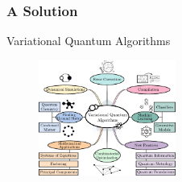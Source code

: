\begin{frame}
    \frametitle{A Solution}

    \begin{center}
        \textcolor{Periwinkle}{\large Variational Quantum Algorithms }

        \begin{figure}
            \includegraphics[width=0.4\textwidth]{figures/vqaapp.pdf}
        \end{figure}
    \end{center}

\end{frame}
